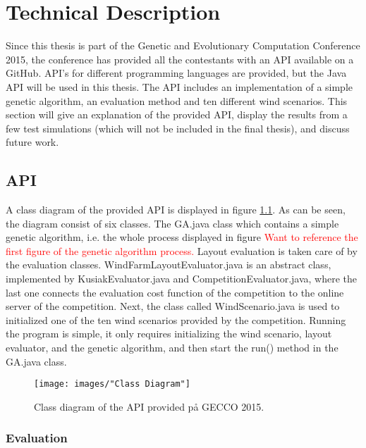 \chapter{Technical Description}


Since this thesis is part of the Genetic and Evolutionary Computation Conference 2015, the conference has provided all the contestants with an API available on a GitHub. API's for different programming languages are provided, but the Java API will be used in this thesis. The API includes an implementation of a simple genetic algorithm, an evaluation method and ten different wind scenarios. This section will give an explanation of the provided API, display the results from a few test simulations (which will not be included in the final thesis), and discuss future work.


\section{API}


A class diagram of the provided API is displayed in figure \ref{Class Diagram}. As can be seen, the diagram consist of six classes. The GA.java class which contains a simple genetic algorithm, i.e. the whole process displayed in figure \textcolor{red}{Want to reference the first figure of the genetic algorithm process.} Layout evaluation is taken care of by the evaluation classes. WindFarmLayoutEvaluator.java is an abstract class, implemented by KusiakEvaluator.java and CompetitionEvaluator.java, where the last one connects the evaluation cost function of the competition to the online server of the competition. Next, the class called WindScenario.java is used to initialized one of the ten wind scenarios provided by the competition. Running the program is simple, it only requires initializing the wind scenario, layout evaluator, and the genetic algorithm, and then start the run() method in the GA.java class.


\begin{figure}[h!]
\begin{center}
\texttt{[image: images/"Class Diagram"]}
\caption{Class diagram of the API provided på GECCO 2015.}
\label{Class Diagram}
\end{center}
\end{figure}


\subsection{Evaluation}


